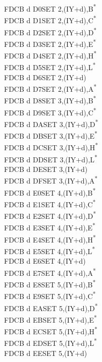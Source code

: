 \documentclass[twoside,openright,a4paper]{book}
\begin{document}
\begin{multicols}{3}
{\begin{tabbing}
	FDCB d D0\>SET 2,(IY+d),B\textsuperscript{*}\\
	FDCB d D1\>SET 2,(IY+d),C\textsuperscript{*}\\
	FDCB d D2\>SET 2,(IY+d),D\textsuperscript{*}\\
	FDCB d D3\>SET 2,(IY+d),E\textsuperscript{*}\\
	FDCB d D4\>SET 2,(IY+d),H\textsuperscript{*}\\
	FDCB d D5\>SET 2,(IY+d),L\textsuperscript{*}\\
	FDCB d D6\>SET 2,(IY+d)\\
	FDCB d D7\>SET 2,(IY+d),A\textsuperscript{*}\\
	FDCB d D8\>SET 3,(IY+d),B\textsuperscript{*}\\
	FDCB d D9\>SET 3,(IY+d),C\textsuperscript{*}\\
	FDCB d DA\>SET 3,(IY+d),D\textsuperscript{*}\\
	FDCB d DB\>SET 3,(IY+d),E\textsuperscript{*}\\
	FDCB d DC\>SET 3,(IY+d),H\textsuperscript{*}\\
	FDCB d DD\>SET 3,(IY+d),L\textsuperscript{*}\\
	FDCB d DE\>SET 3,(IY+d)\\
	FDCB d DF\>SET 3,(IY+d),A\textsuperscript{*}\\
	FDCB d E0\>SET 4,(IY+d),B\textsuperscript{*}\\
	FDCB d E1\>SET 4,(IY+d),C\textsuperscript{*}\\
	FDCB d E2\>SET 4,(IY+d),D\textsuperscript{*}\\
	FDCB d E3\>SET 4,(IY+d),E\textsuperscript{*}\\
	FDCB d E4\>SET 4,(IY+d),H\textsuperscript{*}\\
	FDCB d E5\>SET 4,(IY+d),L\textsuperscript{*}\\
	FDCB d E6\>SET 4,(IY+d)\\
	FDCB d E7\>SET 4,(IY+d),A\textsuperscript{*}\\
	FDCB d E8\>SET 5,(IY+d),B\textsuperscript{*}\\
	FDCB d E9\>SET 5,(IY+d),C\textsuperscript{*}\\
	FDCB d EA\>SET 5,(IY+d),D\textsuperscript{*}\\
	FDCB d EB\>SET 5,(IY+d),E\textsuperscript{*}\\
	FDCB d EC\>SET 5,(IY+d),H\textsuperscript{*}\\
	FDCB d ED\>SET 5,(IY+d),L\textsuperscript{*}\\
	FDCB d EE\>SET 5,(IY+d)\\

\end{tabbing}}
\end{multicols}
\end{document}
